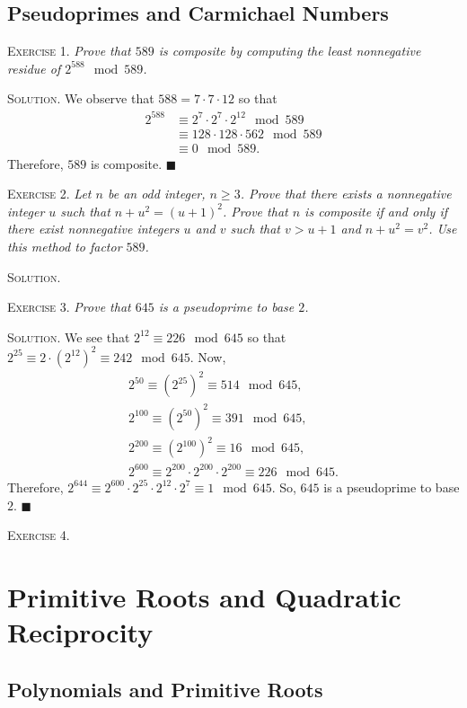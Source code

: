 \documentclass[11pt, leqno]{article}
\newcommand{\done}{\ensuremath{\blacksquare}}
\begin{document}
\subsection{Pseudoprimes and Carmichael Numbers}

\textsc{Exercise 1}. \emph{Prove that $589$ is composite by computing the least nonnegative residue of $2^{588} \mod 589$.}

\textsc{Solution}. We observe that $588 = 7\cdot 7 \cdot 12$ so that 
\begin{align*}
  2^{588} &\equiv 2^7\cdot 2^7 \cdot 2^{12} \mod 589 \\
          &\equiv 128 \cdot 128 \cdot 562 \mod 589 \\
          &\equiv 0 \mod 589.
\end{align*}
Therefore, $589$ is composite. \done

\textsc{Exercise 2}. \emph{Let $n$ be an odd integer, $n\geq 3$. Prove that there exists a nonnegative integer $u$ such that $n+u^2 = (u+1)^2$. Prove that $n$ is composite if and only if there exist nonnegative integers $u$ and $v$ such that $v > u + 1$ and $n+u^2 = v^2$. Use this method to factor $589$.}

\textsc{Solution}.

\textsc{Exercise 3}. \emph{Prove that $645$ is a pseudoprime to base $2$.}

\textsc{Solution}. We see that $2^{12}\equiv 226 \mod 645$ so that $2^{25} \equiv 2\cdot (2^{12})^2 \equiv 242 \mod 645$. Now,
\begin{align*}
  2^{50} \equiv (2^{25})^2 \equiv 514 \mod 645, \\
  2^{100} \equiv (2^{50})^2 \equiv  391 \mod 645, \\
  2^{200} \equiv (2^{100})^2 \equiv 16 \mod 645, \\
  2^{600} \equiv 2^{200}\cdot 2^{200} \cdot 2^{200} \equiv 226 \mod 645.
\end{align*}
Therefore, $2^{644} \equiv 2^{600} \cdot 2^{25} \cdot 2^{12} \cdot 2^7 \equiv 1 \mod 645$. So, $645$ is a pseudoprime to base $2$. \done

\textsc{Exercise 4}. \emph{}

\section{Primitive Roots and Quadratic Reciprocity}

\subsection{Polynomials and Primitive Roots}
\end{document}
